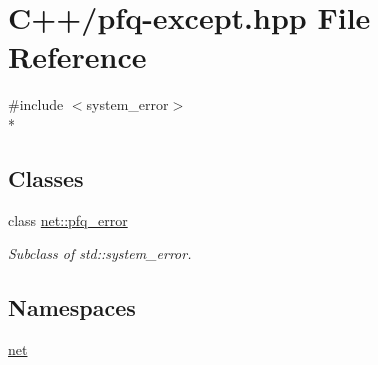 \hypertarget{pfq-except_8hpp}{\section{C++/pfq-\/except.hpp File Reference}
\label{pfq-except_8hpp}
}
{\ttfamily \#include $<$system\-\_\-error$>$}\\*
\subsection*{Classes}
\begin{DoxyCompactItemize}
\item 
class \hyperlink{classnet_1_1pfq__error}{net\-::pfq\-\_\-error}
\begin{DoxyCompactList}\small\item\em Subclass of std\-::system\-\_\-error. \end{DoxyCompactList}\end{DoxyCompactItemize}
\subsection*{Namespaces}
\begin{DoxyCompactItemize}
\item 
\hyperlink{namespacenet}{net}
\end{DoxyCompactItemize}
